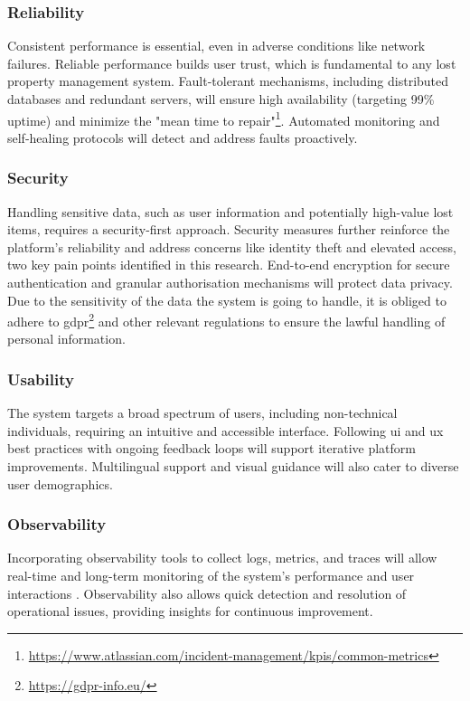 \subsubsection{Reliability} 

Consistent performance is essential, even in adverse conditions like network failures. Reliable performance builds user trust, which is fundamental to any lost property management system. Fault-tolerant mechanisms, including distributed databases and redundant servers, will ensure high availability (targeting 99\% uptime) and minimize the "mean time to repair"\footnote{\url{https://www.atlassian.com/incident-management/kpis/common-metrics}}. Automated monitoring and self-healing protocols will detect and address faults proactively.

\subsubsection{Security}

Handling sensitive data, such as user information and potentially high-value lost items, requires a security-first approach. Security measures further reinforce the platform's reliability and address concerns like identity theft and elevated access, two key pain points identified in this research. End-to-end encryption for secure authentication and granular authorisation mechanisms will protect data privacy. Due to the sensitivity of the data the system is going to handle, it is obliged to adhere to \ac{gdpr}\footnote{\url{https://gdpr-info.eu/}} and other relevant regulations to ensure the lawful handling of personal information.

\subsubsection{Usability}

The system targets a broad spectrum of users, including non-technical individuals, requiring an intuitive and accessible interface. Following \ac{ui} and \ac{ux} best practices with ongoing feedback loops will support iterative platform improvements. Multilingual support and visual guidance will also cater to diverse user demographics.

\subsubsection{Observability}

Incorporating observability tools to collect logs, metrics, and traces will allow real-time and long-term monitoring of the system's performance and user interactions \cite{Niedermaier2023}. Observability also allows quick detection and resolution of operational issues, providing insights for continuous improvement.

